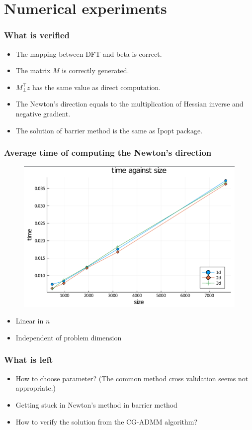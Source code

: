 \documentclass{beamer}
\begin{document}
\section{Numerical experiments}
\begin{frame}
\frametitle{What is verified}
\begin{itemize}
\item The mapping between DFT and beta is correct.
\item The matrix $M$ is correctly generated.
\item $M_{\perp}^{\top}z$ has the same value as direct computation.
\item The Newton's direction equals to the multiplication of Hessian inverse and negative gradient.
\item The solution of barrier method is the same as Ipopt package.
\end{itemize}
\end{frame}

\begin{frame}
\frametitle{Average time of computing the Newton's direction}
\begin{figure}
\includegraphics[width=0.6\linewidth]{lineartime.PNG}
\end{figure}
\begin{itemize}
    \item Linear in $n$
    \item Independent of problem dimension
\end{itemize}
\end{frame}

\begin{frame}
\frametitle{What is left}
\begin{itemize}
\item How to choose parameter? (The common method cross validation seems not appropriate.)
\item Getting stuck in Newton's method in barrier method
\item How to verify the solution from the CG-ADMM algorithm?
\end{itemize}
\end{frame}
\end{document}
